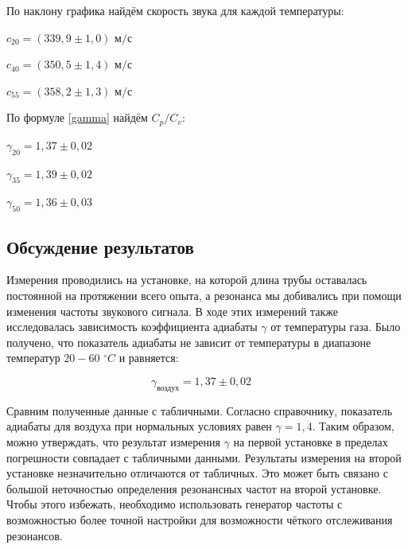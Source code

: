 \documentclass[a4paper, 12pt]{article}
\begin{document}
По наклону графика найдём скорость звука для каждой температуры:

\begin{center}
    $\displaystyle c_{20}=(339,9 \pm 1,0)$ м$/$с 
    \break
    
    $\displaystyle c_{40}=(350,5 \pm 1,4)$ м$/$с 
    \break
    
    $\displaystyle c_{55}=(358,2 \pm 1,3)$ м$/$с 
    \break
\end{center}

По формуле \eqref{gamma} найдём $\displaystyle C_p/C_v$:

\begin{center}
    
    $\displaystyle \gamma_{20}=1,37 \pm 0,02$
    \break
    
    $\displaystyle \gamma_{35}=1,39 \pm 0,02$
    \break
    
    $\displaystyle \gamma_{50}=1,36 \pm 0,03$
    \break
\end{center}

\begin{center}
    \section*{Обсуждение результатов}
\end{center}

Измерения проводились на установке, на которой длина трубы оставалась постоянной на протяжении всего опыта, а резонанса мы добивались при помощи изменения частоты звукового сигнала. В ходе этих измерений также исследовалась зависимость коэффициента адиабаты $ \gamma $ от температуры газа. Было получено, что показатель адиабаты не зависит от температуры в диапазоне температур $ 20-60 $ $ ^\circ C $ и равняется:

\[ \boxed{\gamma_{\text{воздух}} = 1,37 \pm 0,02}\quad\]

Сравним полученные данные с табличными. Согласно справочнику, показатель адиабаты для воздуха при нормальных условиях равен \underline{$ \gamma = 1,4 $}. Таким образом, можно утверждать, что результат измерения $ \gamma $ на первой установке в пределах погрешности совпадает с табличными данными. Результаты измерения на второй установке незначительно отличаются от табличных. Это может быть связано с большой неточностью определения резонансных частот на второй установке. Чтобы этого избежать, необходимо использовать генератор частоты с возможностью более точной настройки для возможности чёткого отслеживания резонансов.
\end{document}

